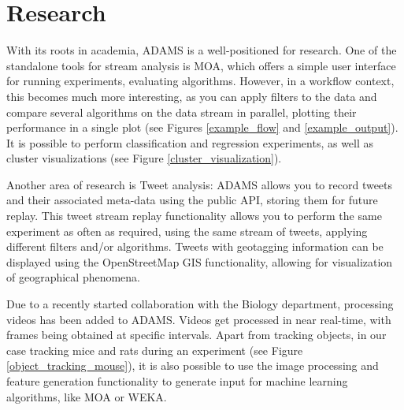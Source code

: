 \documentclass[wcp]{jmlr}
\begin{document}
\section{Research}
With its roots in academia, ADAMS is a well-positioned for research. One of the standalone tools for stream analysis is MOA, which offers a simple user interface for running experiments, evaluating algorithms. However, in a workflow context, this becomes much more interesting, as you can apply filters to the data and compare several algorithms on the data stream in parallel, plotting their performance in a single plot (see Figures \ref{example_flow} and \ref{example_output}). It is possible to perform classification and regression experiments, as well as cluster visualizations (see Figure \ref{cluster_visualization}).

Another area of research is Tweet analysis: ADAMS allows you to record tweets and their associated meta-data using the public API, storing them for future replay. This tweet stream replay functionality allows you to perform the same experiment as often as required, using the same stream of tweets, applying different filters and/or algorithms. Tweets with geotagging information can be displayed using the OpenStreetMap GIS functionality, allowing for visualization of geographical phenomena.

Due to a recently started collaboration with the Biology department, processing videos has been added to ADAMS. Videos get processed in near real-time, with frames being obtained at specific intervals. Apart from tracking objects, in our case tracking mice and rats during an experiment (see Figure \ref{object_tracking_mouse}), it is also possible to use the image processing and feature generation functionality to generate input for machine learning algorithms, like MOA or WEKA.
\end{document}
